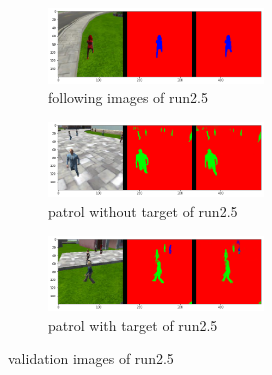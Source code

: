 \documentclass[paper=a4, fontsize=11pt]{scrartcl} %
\numberwithin{equation}{section} %
\numberwithin{figure}{section} %
\numberwithin{table}{section} %
\begin{document}
 \begin{figure}[ht]
	\begin{subfigure}{0.33\textwidth}
	\includegraphics[width=0.9\linewidth, height=2cm]{./imgs/following_images25.png} 
	\caption{following images of run2.5}
	\label{fig:subfollowing_images25}
	\end{subfigure}
	\begin{subfigure}{0.33\textwidth}
	\includegraphics[width=0.9\linewidth, height=2cm]{./imgs/patrol_non_targ25.png}
	\caption{patrol without target of run2.5}
	\label{fig:subpatrol_non_targ25}
	\end{subfigure}
	\begin{subfigure}{0.33\textwidth}
	\includegraphics[width=0.9\linewidth, height=2cm]{./imgs/patrol_with_targ25.png}
	\caption{patrol with target of run2.5}
	\label{fig:subpatrol_with_targ25}
	\end{subfigure}

	\caption{validation images of run2.5}
	\label{fig:outputimages25}
\end{figure}
\end{document}
